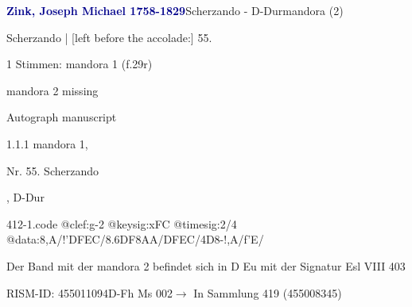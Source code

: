 \documentclass[twocolumn, 12pt]{book}
\begin{document}
\par \vspace{16pt} \textcolor{darkblue}{\textbf{Zink, Joseph Michael  1758-1829}}\hfillplus{\textbf{[412]}}\newline Scherzando - D-Dur\newline mandora (2)
\par \begin{itshape}[f.29r, at left:] Scherzando | [left before the accolade:] 55.\end{itshape} 
\par \textcolor{darkblue}{}  1 Stimmen: mandora 1  (f.29r)\newline \begin{small} mandora 2 missing\end{small} \newline Autograph manuscript
\par 1.1.1  mandora 1, \begin{itshape}Nr. 55. Scherzando\end{itshape}, D-Dur  
\begin{filecontents*}{412-1.code}
@clef:g-2
@keysig:xFC
@timesig:2/4
@data:8,A/!'DFEC/{8.6DF}8AA/DFEC/4D8-!,A/f'E/
\end{filecontents*}
\newline %
\par Der Band mit der mandora 2 befindet sich in D Eu mit der Signatur Esl VIII 403
\par RISM-ID: 455011094\newline D-Fh  Ms 002\newline $\rightarrow$ In Sammlung 419 (455008345)
      
\end{document}
